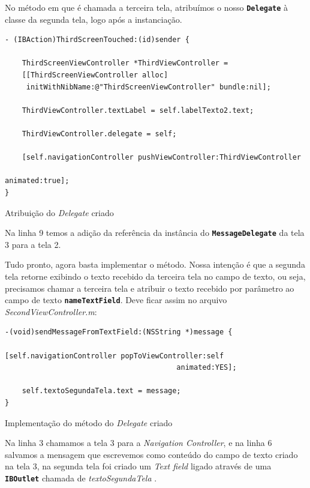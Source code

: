 \documentclass[a4paper,12pt,brazil,oneside]{book}
\begin{document}
No método em que é chamada a terceira tela, atribuímos o nosso \texttt{\textbf{Delegate}} à classe da segunda tela, logo após a instanciação.

\begin{listing}[H]
\begin{verbatim}
- (IBAction)ThirdScreenTouched:(id)sender {

    ThirdScreenViewController *ThirdViewController =
    [[ThirdScreenViewController alloc]
     initWithNibName:@"ThirdScreenViewController" bundle:nil];
    
    ThirdViewController.textLabel = self.labelTexto2.text;
    
    ThirdViewController.delegate = self;
    
    [self.navigationController pushViewController:ThirdViewController 
    													animated:true];
}
\end{verbatim}
\caption{Atribuição do \emph{Delegate} criado}
\end{listing}


Na linha 9 temos a adição da referência da instância do \texttt{\textbf{MessageDelegate}} da tela 3 para a tela 2.

Tudo pronto, agora basta implementar o método. Nossa intenção é que a segunda tela retorne exibindo o texto recebido da terceira tela no campo de texto, ou seja, precisamos chamar a terceira tela e atribuir o texto recebido por parâmetro ao campo de texto \texttt{\textbf{nameTextField}}. Deve ficar assim no arquivo \emph{SecondViewController.m}:

\begin{listing}[H]
\begin{verbatim}
-(void)sendMessageFromTextField:(NSString *)message { 

[self.navigationController popToViewController:self 
										animated:YES];
										
    self.textoSegundaTela.text = message;
}
\end{verbatim}
\caption{Implementação do método do \emph{Delegate} criado}
\end{listing}


Na linha 3 chamamos a tela 3 para a \emph{Navigation Controller}, e na linha 6 salvamos a mensagem que escrevemos como conteúdo do campo de texto criado na tela 3, na segunda tela foi criado um \emph{Text field} ligado através de uma \texttt{\textbf{IBOutlet}} chamada de \emph{textoSegundaTela} .
\end{document}
